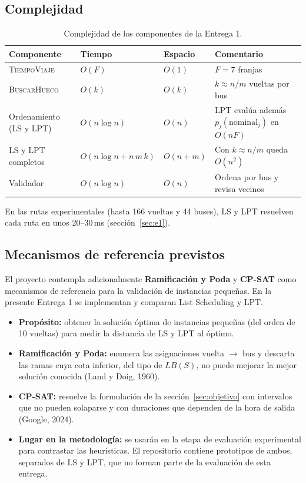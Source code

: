 \subsection{Complejidad}
\begin{table}[H]
\centering\small
\caption{Complejidad de los componentes de la Entrega 1.}
\begin{tabularx}{\textwidth}{L{3.8cm}L{3.6cm}L{1.6cm}Y}
\toprule
Componente & Tiempo & Espacio & Comentario \\
\midrule
\textsc{TiempoViaje} & $O(F)$ & $O(1)$ & $F = 7$ franjas \\
\textsc{BuscarHueco} & $O(k)$ & $O(k)$ & $k \approx n/m$ vueltas por bus \\
Ordenamiento (LS y LPT) & $O(n \log n)$ & $O(n)$ & LPT evalúa además $p_j(\text{nominal}_j)$ en $O(n F)$ \\
LS y LPT completos & $O(n \log n + n\, m\, k)$ & $O(n + m)$ & Con $k \approx n/m$ queda $O(n^2)$ \\
Validador & $O(n \log n)$ & $O(n)$ & Ordena por bus y revisa vecinos \\
\bottomrule
\end{tabularx}
\end{table}
En las rutas experimentales (hasta 166 vueltas y 44 buses), LS y LPT resuelven cada ruta en unos 20--30\,ms (sección~\ref{sec:e1}).

\subsection{Mecanismos de referencia previstos}\label{sec:referencia}
El proyecto contempla adicionalmente \textbf{Ramificación y Poda} y \textbf{CP-SAT} como mecanismos de referencia para la validación de instancias pequeñas. En la presente Entrega 1 se implementan y comparan List Scheduling y LPT.
\begin{itemize}
  \item \textbf{Propósito:} obtener la solución óptima de instancias pequeñas (del orden de 10 vueltas) para medir la distancia de LS y LPT al óptimo.
  \item \textbf{Ramificación y Poda:} enumera las asignaciones vuelta $\to$ bus y descarta las ramas cuya cota inferior, del tipo de $LB(S)$, no puede mejorar la mejor solución conocida (Land y Doig, 1960).
  \item \textbf{CP-SAT:} resuelve la formulación de la sección~\ref{sec:objetivo} con intervalos que no pueden solaparse y con duraciones que dependen de la hora de salida (Google, 2024).
  \item \textbf{Lugar en la metodología:} se usarán en la etapa de evaluación experimental para contrastar las heurísticas. El repositorio contiene prototipos de ambos, separados de LS y LPT, que no forman parte de la evaluación de esta entrega.
\end{itemize}
